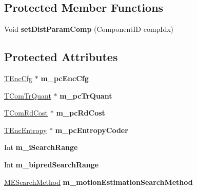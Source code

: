 \subsection*{Protected Member Functions}
\begin{DoxyCompactItemize}
\item 
\mbox{\label{class_t_enc_search_a25a8a7ec7897fd02355c12f9eda16322}} 
Void {\bfseries set\+Dist\+Param\+Comp} (Component\+ID comp\+Idx)
\end{DoxyCompactItemize}
\subsection*{Protected Attributes}
\begin{DoxyCompactItemize}
\item 
\mbox{\label{class_t_enc_search_a1c08159ee170a7a44bdedfddc3d34240}} 
\hyperlink{class_t_enc_cfg}{T\+Enc\+Cfg} $\ast$ {\bfseries m\+\_\+pc\+Enc\+Cfg}
\item 
\mbox{\label{class_t_enc_search_adfb4b444e9f502934212bf11795d0db8}} 
\hyperlink{class_t_com_tr_quant}{T\+Com\+Tr\+Quant} $\ast$ {\bfseries m\+\_\+pc\+Tr\+Quant}
\item 
\mbox{\label{class_t_enc_search_a044ef57c6a7d45cd5f79c08b96bdb60b}} 
\hyperlink{class_t_com_rd_cost}{T\+Com\+Rd\+Cost} $\ast$ {\bfseries m\+\_\+pc\+Rd\+Cost}
\item 
\mbox{\label{class_t_enc_search_aac93e6ef3e8393eed6ff9eae21078baa}} 
\hyperlink{class_t_enc_entropy}{T\+Enc\+Entropy} $\ast$ {\bfseries m\+\_\+pc\+Entropy\+Coder}
\item 
\mbox{\label{class_t_enc_search_ad8a24a1e770b0dd6cbfaf3ee685e2345}} 
Int {\bfseries m\+\_\+i\+Search\+Range}
\item 
\mbox{\label{class_t_enc_search_a8883d6354b08534a05af841abbc727a4}} 
Int {\bfseries m\+\_\+bipred\+Search\+Range}
\item 
\mbox{\label{class_t_enc_search_a62b25e9986cb57275cd0275e64cb416b}} 
\hyperlink{_type_def_8h_a8aca966885e6dbeca4cabfc3530a9bde}{M\+E\+Search\+Method} {\bfseries m\+\_\+motion\+Estimation\+Search\+Method}

\end{DoxyCompactItemize}
